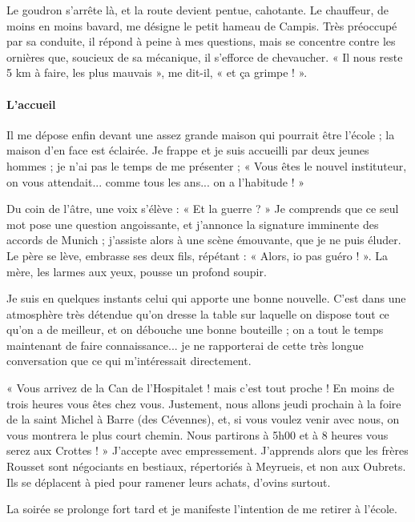 Le goudron s'arrête là, et la route devient pentue, cahotante. Le chauffeur, de moins en moins bavard, me désigne le petit hameau de Campis. Très préoccupé par sa conduite, il répond à peine à mes questions, mais se concentre contre les ornières que, soucieux de sa mécanique, il s'efforce de chevaucher. « Il nous reste 5 km à faire, les plus mauvais », me dit-il, « et ça grimpe ! ».

\paragraph{L'accueil}

Il me dépose enfin devant une assez grande maison qui pourrait être l'école ; la maison d'en face est éclairée. Je frappe et je suis accueilli par deux jeunes hommes ; je n'ai pas le temps de me présenter ; « Vous êtes le nouvel instituteur, on vous attendait... comme tous les ans... on a l'habitude ! »


Du coin de l'âtre, une voix s'élève : « Et la guerre ? » Je comprends que ce seul mot
pose une question angoissante, et j'annonce la signature imminente des accords de
Munich ; j'assiste alors à une scène émouvante, que je ne puis éluder. Le père se lève,
embrasse ses deux fils, répétant : « Alors, io pas guéro ! ». La mère, les larmes aux
yeux, pousse un profond soupir.

Je suis en quelques instants celui qui apporte une bonne nouvelle. C'est dans une
atmosphère très détendue qu'on dresse la table sur laquelle on dispose tout ce qu'on a
de meilleur, et on débouche une bonne bouteille ; on a tout le temps maintenant de
faire connaissance... je ne rapporterai de cette très longue conversation que ce qui
m'intéressait directement.

« Vous arrivez de la Can de l'Hospitalet ! mais c'est tout proche ! En moins de trois
heures vous êtes chez vous. Justement, nous allons jeudi prochain à la foire de la saint
Michel à Barre (des Cévennes), et, si vous voulez venir avec nous, on vous montrera
le plus court chemin. Nous partirons à 5h00 et à 8 heures vous serez aux Crottes ! »
J'accepte avec empressement. J'apprends alors que les frères Rousset sont négociants
en bestiaux, répertoriés à Meyrueis, et non aux Oubrets. Ils se déplacent à pied pour
ramener leurs achats, d'ovins surtout.

La soirée se prolonge fort tard et je manifeste l'intention de me retirer à l'école.

